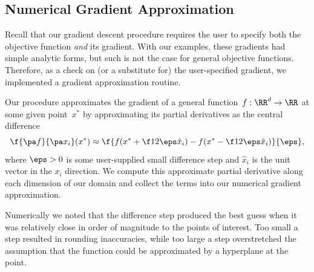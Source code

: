 \documentclass{article}
\begin{document}
\begin{multicols}{2}


\subsection{Numerical Gradient Approximation}
\label{subsec:grad-approx}

Recall that our gradient descent procedure requires the user to specify both the objective function \emph{and} its gradient. With our examples, these gradients had simple analytic forms, but such is not the case for general objective functions. Therefore, as a check on (or a substitute for) the user-specified gradient, we implemented a gradient approximation routine.

Our procedure approximates the gradient of a general function~$f:\RR^d\to\RR$ at some given point~$x^*$ by approximating its partial derivatives as the central difference
\begin{equation}
\label{eq:grad-approx}
\f{\pa f}{\pa x_i}(x^*) \approx \f{f(x^* + \f12\eps\hat x_i) - f(x^* - \f12 \eps\hat x_i)}{\eps},
\end{equation}
where $\eps > 0$ is some user-supplied small difference step and $\hat x_i$ is the unit vector in the $x_i$ direction. We compute this approximate partial derivative along each dimension of our domain and collect the terms into our numerical gradient approximation. 


Numerically we noted that the difference step produced the best guess when it was relatively close in order of magnitude to the points of interest. Too small a step resulted in rounding inaccuracies, while too large a step overstretched the assumption that the function could be approximated by a hyperplane at the point.


\end{multicols}
\end{document}
